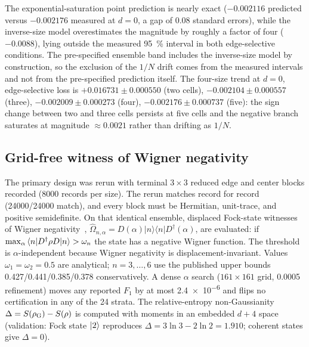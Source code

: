 \documentclass[aps,pra,preprint,superscriptaddress,amsmath,amssymb]{revtex4-2}
\providecommand{\ketbra}[2]{|#1\rangle\langle#2|}
\begin{document}
The exponential-saturation point prediction is nearly exact ($-\num{0.002116}$ predicted versus $-\num{0.002176}$ measured at $d=\num{0}$, a gap of \num{0.08} standard errors), while the inverse-size model overestimates the magnitude by roughly a factor of four ($-\num{0.0088}$), lying outside the measured \qty{95}{\percent} interval in both edge-selective conditions. The pre-specified ensemble band includes the inverse-size model by construction, so the exclusion of the $1/N$ drift comes from the measured intervals and not from the pre-specified prediction itself. The four-size trend at $d=\num{0}$, edge-selective loss is $+\num{0.016731}\pm\num{0.000550}$ (two cells), $-\num{0.002104}\pm\num{0.000557}$ (three), $-\num{0.002009}\pm\num{0.000273}$ (four), $-\num{0.002176}\pm\num{0.000737}$ (five): the sign change between two and three cells persists at five cells and the negative branch saturates at magnitude ${\approx}\num{0.0021}$ rather than drifting as $1/N$.

\subsection{Grid-free witness of Wigner negativity}
\label{sec:witness}

The primary design was rerun with terminal $\num{3}\times\num{3}$ reduced edge and center blocks recorded (\num{8000} records per size). The rerun matches record for record (\num{24000}/\num{24000} match), and every block must be Hermitian, unit-trace, and positive semidefinite. On that identical ensemble, displaced Fock-state witnesses of Wigner negativity~\cite{Chabaud2021witnessingwigner}, $\hat\Omega_{n,\alpha}=D(\alpha)\ketbra{n}{n}D^{\dagger}(\alpha)$, are evaluated: if $\max_\alpha\braket{n|D^{\dagger}\rho D|n}>\omega_n$ the state has a negative Wigner function. The threshold is $\alpha$-independent because Wigner negativity is displacement-invariant. Values $\omega_1=\omega_2=\num{0.5}$ are analytical; $n=\num{3},\ldots,\num{6}$ use the published upper bounds \num{0.427}/\num{0.441}/\num{0.385}/\num{0.378} conservatively. A dense $\alpha$ search ($\num{161}\times\num{161}$ grid, \num{0.0005} refinement) moves any reported $F_1$ by at most \num{2.4e-6} and flips no certification in any of the \num{24} strata. The relative-entropy non-Gaussianity~\cite{Albarelli2018} $\Delta=S(\rho_{\rm G})-S(\rho)$ is computed with moments in an embedded $d+4$ space (validation: Fock state $\ket{2}$ reproduces $\Delta=3\ln3-2\ln2=\num{1.910}$; coherent states give $\Delta=\num{0}$).
\end{document}
